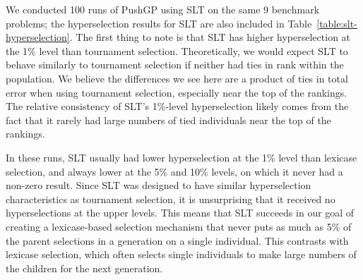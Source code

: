 \documentclass{sig-alternate}
\begin{document}
We conducted 100 runs of PushGP using SLT on the same 9 benchmark problems; the hyperselection results for SLT are also included in Table~\ref{table:slt-hyperselection}. The first thing to note is that SLT has higher hyperselection at the 1\% level than tournament selection. Theoretically, we would expect SLT to behave similarly to tournament selection if neither had ties in rank within the population. We believe the differences we see here are a product of ties in total error when using tournament selection, especially near the top of the rankings. The relative consistency of SLT's 1\%-level hyperselection likely comes from the fact that it rarely had large numbers of tied individuals near the top of the rankings.



In these runs, SLT usually had lower hyperselection at the 1\% level than lexicase selection, and always lower at the 5\% and 10\% levels, on which it never had a non-zero result. Since SLT was designed to have similar hyperselection characteristics as tournament selection, it is unsurprising that it received no hyperselections at the upper levels. This means that SLT succeeds in our goal of creating a lexicase-based selection mechanism that never puts as much as 5\% of the parent selections in a generation on a single individual. This contrasts with lexicase selection, which often selects single individuals to make large numbers of the children for the next generation.
\end{document}
